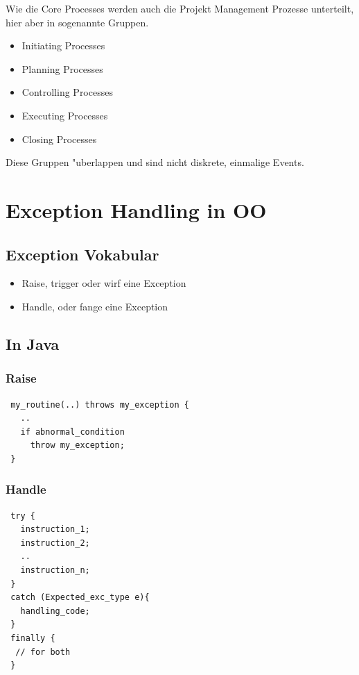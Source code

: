 \documentclass[german, 10pt, a4paper, twocolumn]{scrartcl}
\theoremstyle{definition}
\begin{document}
Wie die Core Processes werden auch die Projekt Management Prozesse unterteilt, hier aber in sogenannte Gruppen.

\begin{itemize}
	\item Initiating Processes
	\item Planning Processes
	\item Controlling Processes
	\item Executing Processes
	\item Closing Processes
\end{itemize}

Diese Gruppen "uberlappen und sind nicht diskrete, einmalige Events.

\section{Exception Handling in OO}

\subsection{Exception Vokabular}

\begin{itemize}
	\item Raise, trigger oder wirf eine Exception
	\item Handle, oder fange eine Exception
\end{itemize}

\subsection{In Java}

\subsubsection{Raise}

\begin{verbatim}
 my_routine(..) throws my_exception {
   ..
   if abnormal_condition
     throw my_exception;
 }
\end{verbatim}

\subsubsection{Handle}

\begin{verbatim}
 try {
   instruction_1;
   instruction_2;
   ..
   instruction_n;
 }
 catch (Expected_exc_type e){
   handling_code;
 }
 finally {
  // for both
 }
\end{verbatim}
\end{document}
